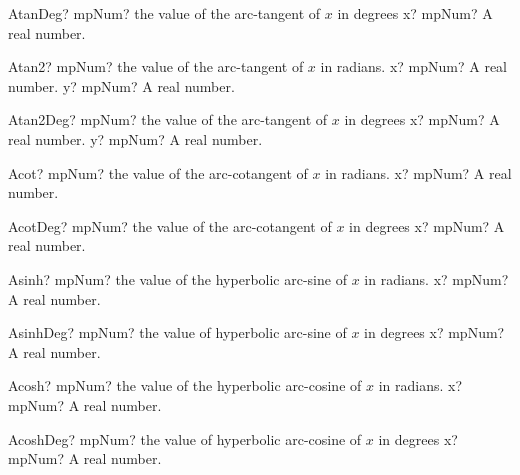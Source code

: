 \documentclass[12pt,a4paper,openany]{book}
\begin{document}
\begin{mpFunctionsExtract}
\mpFunctionOne
{AtanDeg? mpNum? the value of the arc-tangent of $x$ in degrees}
{x? mpNum? A real number.}
\end{mpFunctionsExtract}

\begin{mpFunctionsExtract}
\mpFunctionTwo
{Atan2? mpNum? the value of the arc-tangent of $x$ in radians.}
{x? mpNum? A real number.}
{y? mpNum? A real number.}
\end{mpFunctionsExtract}

\begin{mpFunctionsExtract}
\mpFunctionTwo
{Atan2Deg? mpNum? the value of the arc-tangent of $x$ in degrees}
{x? mpNum? A real number.}
{y? mpNum? A real number.}
\end{mpFunctionsExtract}

\begin{mpFunctionsExtract}
\mpFunctionOne
{Acot? mpNum? the value of the arc-cotangent of $x$ in radians.}
{x? mpNum? A real number.}
\end{mpFunctionsExtract}

\begin{mpFunctionsExtract}
\mpFunctionOne
{AcotDeg? mpNum? the value of the arc-cotangent of $x$ in degrees}
{x? mpNum? A real number.}
\end{mpFunctionsExtract}

\begin{mpFunctionsExtract}
\mpFunctionOne
{Asinh? mpNum? the value of the hyperbolic arc-sine  of $x$ in radians.}
{x? mpNum? A real number.}
\end{mpFunctionsExtract}

\begin{mpFunctionsExtract}
\mpFunctionOne
{AsinhDeg? mpNum? the value of hyperbolic arc-sine  of $x$ in degrees}
{x? mpNum? A real number.}
\end{mpFunctionsExtract}

\begin{mpFunctionsExtract}
\mpFunctionOne
{Acosh? mpNum? the value of the hyperbolic arc-cosine  of $x$ in radians.}
{x? mpNum? A real number.}
\end{mpFunctionsExtract}

\begin{mpFunctionsExtract}
\mpFunctionOne
{AcoshDeg? mpNum? the value of hyperbolic arc-cosine  of $x$ in degrees}
{x? mpNum? A real number.}
\end{mpFunctionsExtract}
\end{document}
